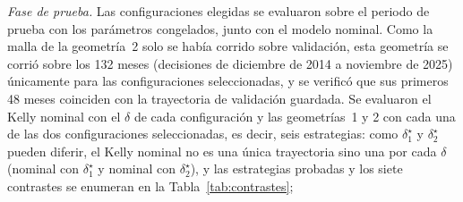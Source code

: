 \emph{Fase de prueba.} 
Las configuraciones elegidas se evaluaron sobre el periodo de prueba con los parámetros congelados, junto con el modelo nominal. Como la malla de la geometría~2 solo se había corrido sobre validación, esta geometría se corrió sobre los 132 meses (decisiones de diciembre de 2014 a noviembre de 2025) únicamente para las configuraciones seleccionadas, y se verificó que sus primeros 48 meses coinciden con la trayectoria de validación guardada. Se evaluaron el Kelly nominal con el $\delta$ de cada configuración y las geometrías~1 y 2 con cada una de las dos configuraciones seleccionadas, es decir, seis estrategias: como $\delta_1^\star$ y $\delta_2^\star$ pueden diferir, el Kelly nominal no es una única trayectoria sino una por cada $\delta$ (nominal con $\delta_1^\star$ y nominal con $\delta_2^\star$), y las estrategias probadas y los siete contrastes se enumeran en la Tabla~\ref{tab:contrastes};

